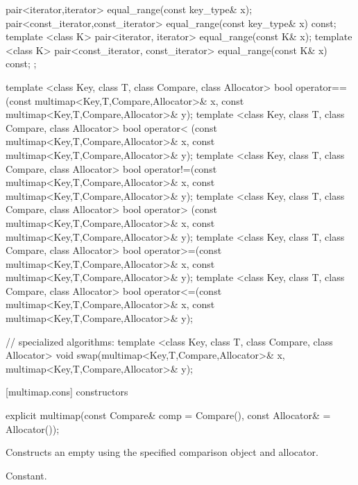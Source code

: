 \begin{codeblock}
{{    pair<iterator,iterator>
      equal_range(const key_type& x);
    pair<const_iterator,const_iterator>
      equal_range(const key_type& x) const;
    template <class K>
      pair<iterator, iterator>             equal_range(const K& x);
    template <class K>
      pair<const_iterator, const_iterator> equal_range(const K& x) const;
  };

  template <class Key, class T, class Compare, class Allocator>
    bool operator==(const multimap<Key,T,Compare,Allocator>& x,
                    const multimap<Key,T,Compare,Allocator>& y);
  template <class Key, class T, class Compare, class Allocator>
    bool operator< (const multimap<Key,T,Compare,Allocator>& x,
                    const multimap<Key,T,Compare,Allocator>& y);
  template <class Key, class T, class Compare, class Allocator>
    bool operator!=(const multimap<Key,T,Compare,Allocator>& x,
                    const multimap<Key,T,Compare,Allocator>& y);
  template <class Key, class T, class Compare, class Allocator>
    bool operator> (const multimap<Key,T,Compare,Allocator>& x,
                    const multimap<Key,T,Compare,Allocator>& y);
  template <class Key, class T, class Compare, class Allocator>
    bool operator>=(const multimap<Key,T,Compare,Allocator>& x,
                    const multimap<Key,T,Compare,Allocator>& y);
  template <class Key, class T, class Compare, class Allocator>
    bool operator<=(const multimap<Key,T,Compare,Allocator>& x,
                    const multimap<Key,T,Compare,Allocator>& y);

  // specialized algorithms:
  template <class Key, class T, class Compare, class Allocator>
    void swap(multimap<Key,T,Compare,Allocator>& x,
              multimap<Key,T,Compare,Allocator>& y);
}
\end{codeblock}%
%

[multimap.cons]{ constructors}

%
%
\begin{itemdecl}
explicit multimap(const Compare& comp = Compare(),
                  const Allocator& = Allocator());
\end{itemdecl}

\begin{itemdescr}
\pnum
\effects
Constructs an empty
using the specified comparison object and allocator.

\pnum
\complexity
Constant.
\end{itemdescr}

